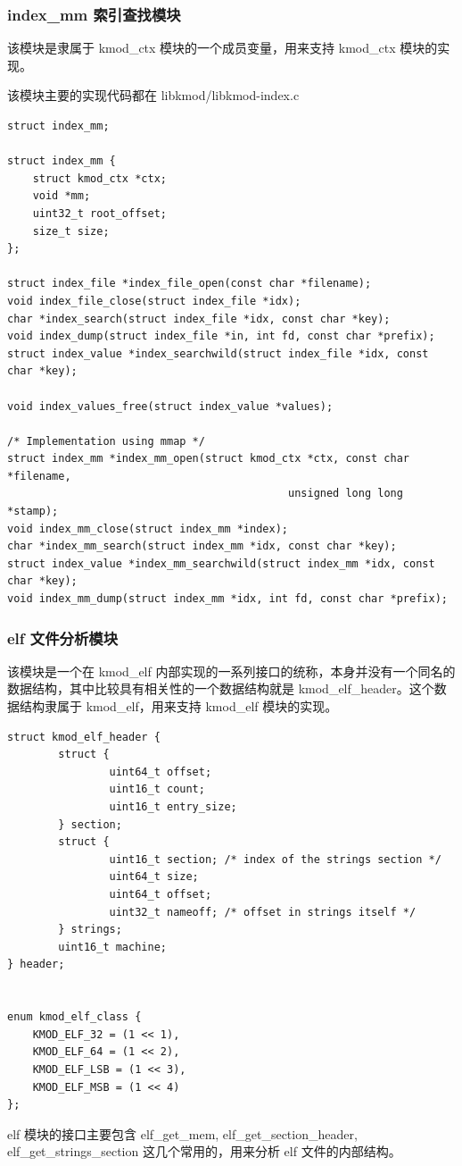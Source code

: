 \documentclass[11pt,a4paper]{article}
\begin{document}
\subsubsection{index\_mm 索引查找模块}

该模块是隶属于 kmod\_ctx 模块的一个成员变量，用来支持 kmod\_ctx
模块的实现。

该模块主要的实现代码都在 libkmod/libkmod-index.c

{\begin{shaded}\begin{verbatim}
struct index_mm;

struct index_mm {
    struct kmod_ctx *ctx;
    void *mm;
    uint32_t root_offset;
    size_t size;
};

struct index_file *index_file_open(const char *filename);
void index_file_close(struct index_file *idx);
char *index_search(struct index_file *idx, const char *key);
void index_dump(struct index_file *in, int fd, const char *prefix);
struct index_value *index_searchwild(struct index_file *idx, const char *key);

void index_values_free(struct index_value *values);

/* Implementation using mmap */
struct index_mm *index_mm_open(struct kmod_ctx *ctx, const char *filename,
                                            unsigned long long *stamp);
void index_mm_close(struct index_mm *index);        
char *index_mm_search(struct index_mm *idx, const char *key);
struct index_value *index_mm_searchwild(struct index_mm *idx, const char *key);
void index_mm_dump(struct index_mm *idx, int fd, const char *prefix);
\end{verbatim}\end{shaded}}
\subsubsection{elf 文件分析模块}

该模块是一个在 kmod\_elf
内部实现的一系列接口的统称，本身并没有一个同名的数据结构，其中比较具有相关性的一个数据结构就是
kmod\_elf\_header。这个数据结构隶属于 kmod\_elf，用来支持 kmod\_elf
模块的实现。

{\begin{shaded}\begin{verbatim}
struct kmod_elf_header {
        struct {
                uint64_t offset;
                uint16_t count;
                uint16_t entry_size;
        } section;
        struct {
                uint16_t section; /* index of the strings section */
                uint64_t size;
                uint64_t offset;
                uint32_t nameoff; /* offset in strings itself */
        } strings;
        uint16_t machine;
} header;


enum kmod_elf_class {
    KMOD_ELF_32 = (1 << 1),
    KMOD_ELF_64 = (1 << 2),
    KMOD_ELF_LSB = (1 << 3),
    KMOD_ELF_MSB = (1 << 4)
};
\end{verbatim}\end{shaded}}
elf 模块的接口主要包含 elf\_get\_mem, elf\_get\_section\_header,
elf\_get\_strings\_section 这几个常用的，用来分析 elf 文件的内部结构。
\end{document}
